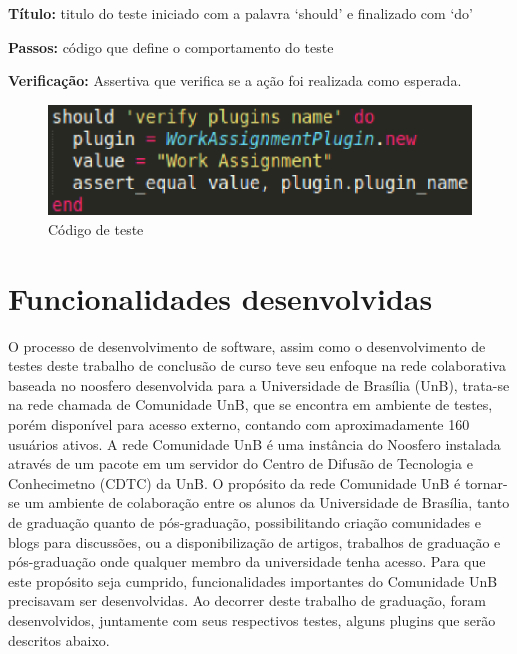\textbf{Título:} titulo do teste iniciado com a palavra ‘should’ e finalizado com ‘do’

\textbf{Passos:} código que define o comportamento do teste

\textbf{Verificação:} Assertiva que verifica se a ação foi realizada como esperada.

\begin{figure}[!h]
    \centering
    \includegraphics[keepaspectratio=true,scale=0.55]
      {figuras/teste_should.eps}
    \caption{Código de teste}
    \label{noosfero_should}
\end{figure}


\section{Funcionalidades desenvolvidas}
O processo de desenvolvimento de software, assim como o desenvolvimento de testes 
deste trabalho de conclusão de curso teve seu enfoque na rede colaborativa baseada 
no noosfero desenvolvida para a Universidade de Brasília (UnB), trata-se na rede 
chamada de Comunidade UnB, que se encontra em ambiente de testes, porém disponível 
para acesso externo, contando com aproximadamente 160 usuários ativos. A rede 
Comunidade UnB é uma instância do Noosfero instalada através de um pacote em um 
servidor do Centro de Difusão de Tecnologia e Conhecimetno (CDTC) da UnB.
%
O propósito da rede Comunidade UnB é tornar-se um ambiente de colaboração entre os 
alunos da Universidade de Brasília, tanto de graduação quanto de pós-graduação, 
possibilitando criação comunidades e blogs para discussões, ou a disponibilização 
de artigos, trabalhos de graduação e pós-graduação onde qualquer membro da universidade 
tenha acesso.
%
Para que este propósito seja cumprido, funcionalidades importantes do Comunidade 
UnB precisavam ser desenvolvidas. Ao decorrer deste trabalho de graduação, foram 
desenvolvidos, juntamente com seus respectivos testes, alguns plugins que serão 
descritos abaixo.
